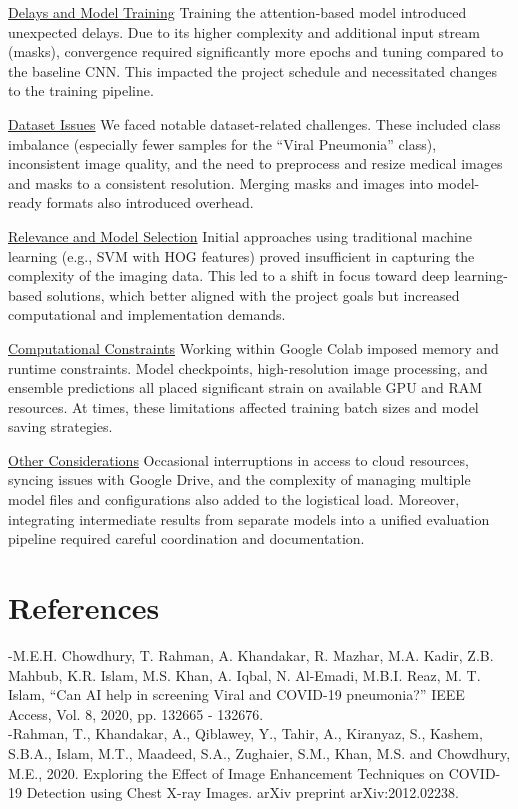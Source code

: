\documentclass{article}
\begin{document}
\underline{Delays and Model Training}
Training the attention-based model introduced unexpected delays. Due to its higher complexity and additional input stream (masks), convergence required significantly more epochs and tuning compared to the baseline CNN. This impacted the project schedule and necessitated changes to the training pipeline.

\underline{Dataset Issues}
We faced notable dataset-related challenges. These included class imbalance (especially fewer samples for the “Viral Pneumonia” class), inconsistent image quality, and the need to preprocess and resize medical images and masks to a consistent resolution. Merging masks and images into model-ready formats also introduced overhead.

\underline{Relevance and Model Selection}
Initial approaches using traditional machine learning (e.g., SVM with HOG features) proved insufficient in capturing the complexity of the imaging data. This led to a shift in focus toward deep learning-based solutions, which better aligned with the project goals but increased computational and implementation demands.

\underline{Computational Constraints}
Working within Google Colab imposed memory and runtime constraints. Model checkpoints, high-resolution image processing, and ensemble predictions all placed significant strain on available GPU and RAM resources. At times, these limitations affected training batch sizes and model saving strategies.

\underline{Other Considerations}
Occasional interruptions in access to cloud resources, syncing issues with Google Drive, and the complexity of managing multiple model files and configurations also added to the logistical load. Moreover, integrating intermediate results from separate models into a unified evaluation pipeline required careful coordination and documentation.



\section{References}

-M.E.H. Chowdhury, T. Rahman, A. Khandakar, R. Mazhar, M.A. Kadir, Z.B. Mahbub, K.R. Islam, M.S. Khan, A. Iqbal, N. Al-Emadi, M.B.I. Reaz, M. T. Islam, “Can AI help in screening Viral and COVID-19 pneumonia?” IEEE Access, Vol. 8, 2020, pp. 132665 - 132676.\\
-Rahman, T., Khandakar, A., Qiblawey, Y., Tahir, A., Kiranyaz, S., Kashem, S.B.A., Islam, M.T., Maadeed, S.A., Zughaier, S.M., Khan, M.S. and Chowdhury, M.E., 2020. Exploring the Effect of Image Enhancement Techniques on COVID-19 Detection using Chest X-ray Images. arXiv preprint arXiv:2012.02238. 
\end{document}
